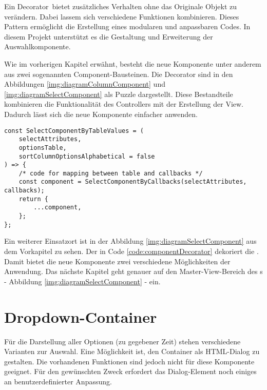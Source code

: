 Ein Decorator\footnotemark \ bietet zusätzliches Verhalten ohne das Originale Objekt zu verändern.
Dabei lassem sich verschiedene Funktionen kombinieren.
Dieses Pattern ermöglicht die Erstellung eines modularen und anpassbaren Codes.
In diesem Projekt unterstützt es die Gestaltung und Erweiterung der Auswahlkomponente.

Wie im vorherigen Kapitel erwähnt, besteht die neue Komponente unter anderem aus zwei sogenannten Component-Bausteinen.
Die Decorator sind in den Abbildungen \ref{img:diagramColumnComponent} und \ref{img:diagramSelectComponent} als Puzzle dargestellt.
Diese Bestandteile kombinieren die Funktionalität des Controllers mit der Erstellung der View.
Dadurch lässt sich die neue Komponente einfacher anwenden.

\begin{lstlisting}[style = htmlcssjs, caption = \codestyle{SelectComponentByTableValue} dekoriert \codestyle{SelectComponentByCallback}, label = code:componentDecorator]
const SelectComponentByTableValues = (
    selectAttributes,
    optionsTable,
    sortColumnOptionsAlphabetical = false
) => {
    /* code for mapping between table and callbacks */
    const component = SelectComponentByCallbacks(selectAttributes, callbacks);
    return {
        ...component,
    };
};
\end{lstlisting}

Ein weiterer Einsatzort ist in der Abbildung \ref{img:diagramSelectComponent} aus dem Vorkapitel zu sehen. 
Der  in Code \ref{code:componentDecorator} dekoriert die .
Damit bietet die neue Komponente zwei verschiedene Möglichkeiten der Anwendung.
Das nächste Kapitel geht genauer auf den Master-View-Bereich des s - Abbildung \ref{img:diagramSelectComponent} - ein. 


\section{Dropdown-Container}
\label{sec:dropdownContainer}

Für die Darstellung aller Optionen (zu gegebener Zeit) stehen verschiedene Varianten zur Auswahl.
Eine Möglichkeit ist, den Container als HTML-Dialog zu gestalten.
Die vorhandenen Funktionen sind jedoch nicht für diese Komponente geeignet.
Für den gewünschten Zweck erfordert das Dialog-Element noch einiges an benutzerdefinierter Anpassung.

